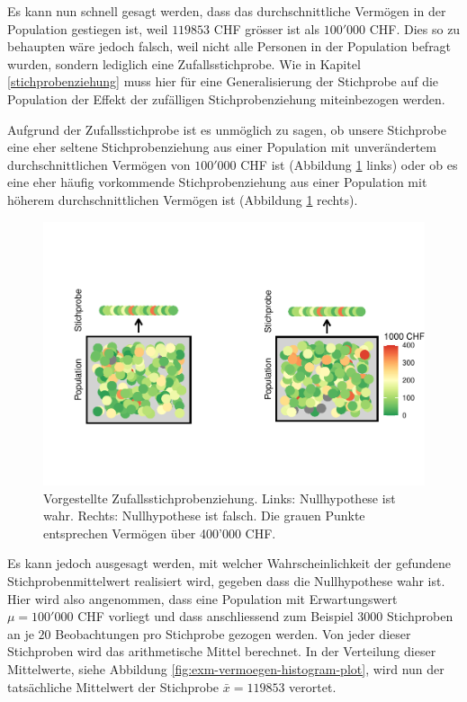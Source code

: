 \documentclass[
]{book}
\theoremstyle{definition}
\theoremstyle{definition}
\theoremstyle{definition}
\theoremstyle{definition}
\theoremstyle{remark}
\begin{document}
Es kann nun schnell gesagt werden, dass das durchschnittliche Vermögen in der Population gestiegen ist, weil \(119853\) CHF grösser ist als \(100'000\) CHF. Dies so zu behaupten wäre jedoch falsch, weil nicht alle Personen in der Population befragt wurden, sondern lediglich eine Zufallsstichprobe. Wie in Kapitel \ref{stichprobenziehung} muss hier für eine Generalisierung der Stichprobe auf die Population der Effekt der zufälligen Stichprobenziehung miteinbezogen werden.

Aufgrund der Zufallsstichprobe ist es unmöglich zu sagen, ob unsere Stichprobe eine eher seltene Stichprobenziehung aus einer Population mit unverändertem durchschnittlichen Vermögen von \(100'000\) CHF ist (Abbildung \ref{fig:exm-vermoegen-sampling-plot} links) oder ob es eine eher häufig vorkommende Stichprobenziehung aus einer Population mit höherem durchschnittlichen Vermögen ist (Abbildung \ref{fig:exm-vermoegen-sampling-plot} rechts).

\begin{figure}

{\centering \includegraphics{aps_statistik1_files/figure-latex/exm-vermoegen-sampling-plot-1} 

}

\caption{Vorgestellte Zufallsstichprobenziehung. Links: Nullhypothese ist wahr. Rechts: Nullhypothese ist falsch. Die grauen Punkte entsprechen Vermögen über 400'000 CHF.}\label{fig:exm-vermoegen-sampling-plot}
\end{figure}

Es kann jedoch ausgesagt werden, mit welcher Wahrscheinlichkeit der gefundene Stichprobenmittelwert realisiert wird, gegeben dass die Nullhypothese wahr ist. Hier wird also angenommen, dass eine Population mit Erwartungswert \(\mu = 100'000\) CHF vorliegt und dass anschliessend zum Beispiel \(3000\) Stichproben an je \(20\) Beobachtungen pro Stichprobe gezogen werden. Von jeder dieser Stichproben wird das arithmetische Mittel berechnet. In der Verteilung dieser Mittelwerte, siehe Abbildung \ref{fig:exm-vermoegen-histogram-plot}, wird nun der tatsächliche Mittelwert der Stichprobe \(\bar{x} = 119853\) verortet.
\end{document}
